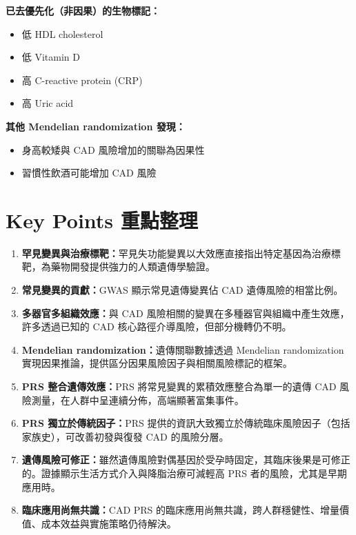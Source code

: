 \documentclass[12pt,a4paper]{article}
\begin{document}
\textbf{已去優先化（非因果）的生物標記：}
\begin{itemize}
    \item 低 HDL cholesterol
    \item 低 Vitamin D
    \item 高 C-reactive protein (CRP)
    \item 高 Uric acid
\end{itemize}

\textbf{其他 Mendelian randomization 發現：}
\begin{itemize}
    \item 身高較矮與 CAD 風險增加的關聯為因果性
    \item 習慣性飲酒可能增加 CAD 風險
\end{itemize}

\section{Key Points 重點整理}

\begin{enumerate}
    \item \textcolor{emergency_red}{\textbf{罕見變異與治療標靶：}}罕見失功能變異以大效應直接指出特定基因為治療標靶，為藥物開發提供強力的人類遺傳學驗證。

    \item \textcolor{emergency_red}{\textbf{常見變異的貢獻：}}GWAS 顯示常見遺傳變異佔 CAD 遺傳風險的相當比例。

    \item \textcolor{emergency_red}{\textbf{多器官多組織效應：}}與 CAD 風險相關的變異在多種器官與組織中產生效應，許多透過已知的 CAD 核心路徑介導風險，但部分機轉仍不明。

    \item \textcolor{emergency_red}{\textbf{Mendelian randomization：}}遺傳關聯數據透過 Mendelian randomization 實現因果推論，提供區分因果風險因子與相關風險標記的框架。

    \item \textcolor{emergency_red}{\textbf{PRS 整合遺傳效應：}}PRS 將常見變異的累積效應整合為單一的遺傳 CAD 風險測量，在人群中呈連續分佈，高端顯著富集事件。

    \item \textcolor{emergency_red}{\textbf{PRS 獨立於傳統因子：}}PRS 提供的資訊大致獨立於傳統臨床風險因子（包括家族史），可改善初發與復發 CAD 的風險分層。

    \item \textcolor{emergency_red}{\textbf{遺傳風險可修正：}}雖然遺傳風險對偶基因於受孕時固定，其臨床後果是可修正的。證據顯示生活方式介入與降脂治療可減輕高 PRS 者的風險，尤其是早期應用時。

    \item \textcolor{emergency_red}{\textbf{臨床應用尚無共識：}}CAD PRS 的臨床應用尚無共識，跨人群穩健性、增量價值、成本效益與實施策略仍待解決。
\end{enumerate}
\end{document}
